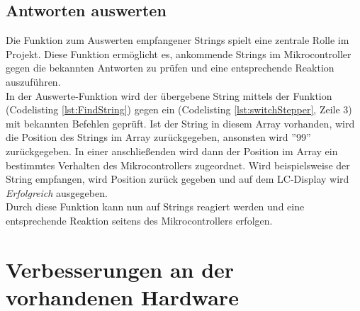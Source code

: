 \subsection{Antworten auswerten}
\label{sec:Auswerten_SM}
Die Funktion zum Auswerten empfangener Strings spielt eine zentrale Rolle im Projekt. Diese Funktion ermöglicht es, ankommende Strings im Mikrocontroller gegen die bekannten Antworten zu prüfen und eine entsprechende Reaktion auszuführen.\\
In der Auswerte-Funktion wird der übergebene String mittels der Funktion\\
(Codelisting \ref{lst:FindString}) gegen ein  (Codelisting \ref{lst:switchStepper}, Zeile 3) mit bekannten Befehlen geprüft. Ist der String in diesem Array vorhanden, wird die Position des Strings im Array zurückgegeben, ansonsten wird ''99'' zurückgegeben. In einer anschließenden  wird dann der Position im Array ein bestimmtes Verhalten des Mikrocontrollers zugeordnet. Wird beispielsweise der String \Code{\#} empfangen, wird Position  zurück gegeben und auf dem LC-Display wird \emph{Erfolgreich} ausgegeben.\\
Durch diese Funktion kann nun auf Strings reagiert werden und eine entsprechende Reaktion seitens des Mikrocontrollers erfolgen. 
\lstset{language=Java, basicstyle=\footnotesize, showstringspaces=false, tabsize=8}

\lstset{language=Java, basicstyle=\footnotesize, showstringspaces=false, tabsize=8}


\section{Verbesserungen an der vorhandenen Hardware}
\label{sec:Verbesserung_Hardware}
